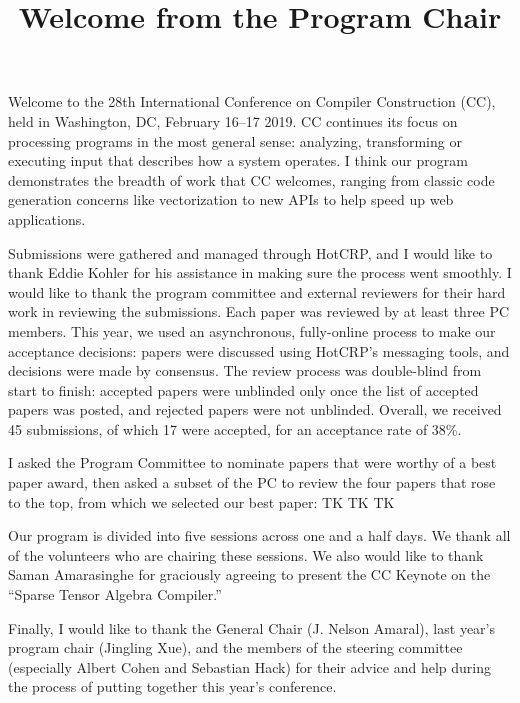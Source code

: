 \documentclass[12pt,letterpaper]{article}
\begin{document}
\title{\sffamily\bfseries Welcome from the Program Chair}
\date{}

\maketitle
\thispagestyle{empty}
\pagestyle{empty}

Welcome to the 28th International Conference on Compiler Construction (CC), held in Washington, DC, February 16--17 2019. CC continues its focus on processing programs in the most general sense: analyzing, transforming or executing input that describes how a system operates. I think our program demonstrates the breadth of work that CC welcomes, ranging from classic code generation concerns like vectorization to new APIs to help speed up web applications.

Submissions were gathered and managed through HotCRP, and I would like to thank Eddie Kohler for his assistance in making sure the process went smoothly. I would like to thank the program committee and external reviewers for their hard work in reviewing the submissions. Each paper was reviewed by at least three PC members.  This year, we used an asynchronous, fully-online process to make our acceptance decisions: papers were discussed using HotCRP's messaging tools, and decisions were made by consensus. The review process was double-blind from start to finish: accepted papers were unblinded only once the list of accepted papers was posted, and rejected papers were not unblinded.
Overall, we received 45 submissions, of which 17 were accepted, for an acceptance rate of 38\%. 

I asked the Program Committee to nominate papers that were worthy of a best paper award, then asked a subset of the PC to review the four papers that rose to the top, from which we selected our best paper: TK TK TK

Our program is divided into five sessions across one and a half days. We thank all of the volunteers who are chairing these sessions. We also would like to thank Saman Amarasinghe for graciously agreeing to present the CC Keynote on the ``Sparse Tensor Algebra Compiler.''

Finally, I would like to thank the General Chair (J. Nelson Amaral), last year's program chair (Jingling Xue), and the members of the steering committee (especially Albert Cohen and Sebastian Hack) for their advice and help during the process of putting together this year's conference.
\end{document}
